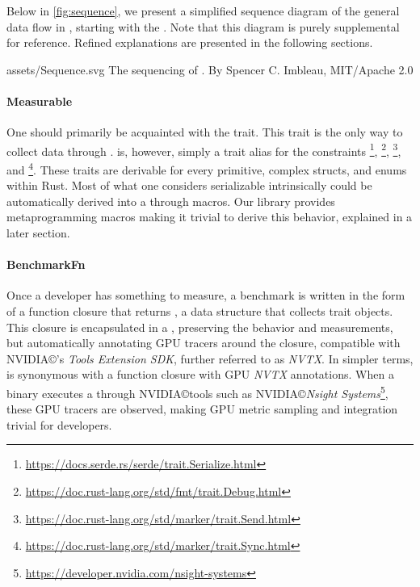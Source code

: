 Below in \cref{fig:sequence}, we present a simplified sequence diagram of the general data flow in \toollinkedname, starting with the . Note that this diagram is purely supplemental for reference. Refined explanations are presented in the following sections.

\widesvg
{assets/Sequence.svg}
{The sequencing of \toollinkedname.\label{fig:sequence}}
{By Spencer C. Imbleau, MIT/Apache 2.0}
\medskip

\paragraph{Measurable}
One should primarily be acquainted with the  trait. This trait is the only way to collect data through \toollinkedname.  is, however, simply a trait alias for the constraints \footnote{\href{https://docs.serde.rs/serde/trait.Serialize.html}{https://docs.serde.rs/serde/trait.Serialize.html}}, \footnote{\href{https://doc.rust-lang.org/std/fmt/trait.Debug.html}{https://doc.rust-lang.org/std/fmt/trait.Debug.html}}, \footnote{\href{https://doc.rust-lang.org/std/marker/trait.Send.html}{https://doc.rust-lang.org/std/marker/trait.Send.html}}, and \footnote{\href{https://doc.rust-lang.org/std/marker/trait.Sync.html}{https://doc.rust-lang.org/std/marker/trait.Sync.html}}. These traits are derivable for every primitive, complex structs, and enums within Rust. Most of what one considers serializable intrinsically could be automatically derived into a  through macros. Our library provides metaprogramming macros making it trivial to derive this behavior, explained in a later section.

\paragraph{BenchmarkFn}\label{sec:benchmarkfn}
Once a developer has something to measure, a benchmark is written in the form of a function closure that returns , a data structure that collects  trait objects. This closure is encapsulated in a , preserving the behavior and measurements, but automatically annotating GPU tracers around the closure, compatible with NVIDIA\copyright's \textit{Tools Extension SDK}, further referred to as \emph{NVTX}. In simpler terms,  is synonymous with a function closure with GPU \textit{NVTX} annotations. When a binary executes a  through NVIDIA\copyright tools such as NVIDIA\copyright \textit{Nsight Systems}\footnote{\href{https://developer.nvidia.com/nsight-systems}{https://developer.nvidia.com/nsight-systems}}, these GPU tracers are observed, making GPU metric sampling and integration trivial for developers.


